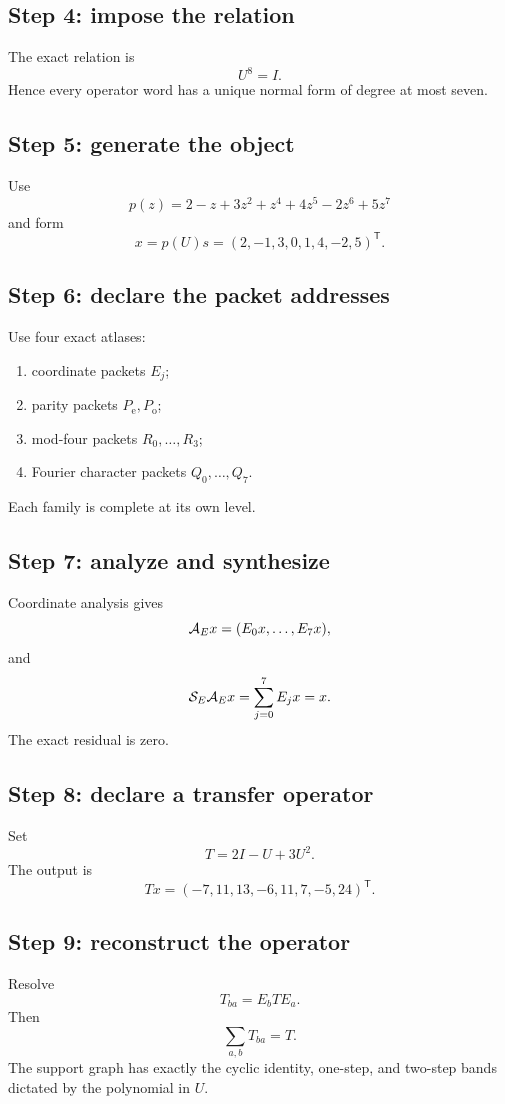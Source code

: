 \subsection{Step 4: impose the relation}
The exact relation is
\[
U^8=I.
\]
Hence every operator word has a unique normal form of degree at most seven.

\subsection{Step 5: generate the object}
Use
\[
p(z)=2-z+3z^2+z^4+4z^5-2z^6+5z^7
\]
and form
\[
x=p(U)s=(2,-1,3,0,1,4,-2,5)^{\mathsf T}.
\]

\subsection{Step 6: declare the packet addresses}
Use four exact atlases:
\begin{enumerate}[label=(\alph*),leftmargin=2em]
\item coordinate packets $E_j$;
\item parity packets $P_{\mathrm e},P_{\mathrm o}$;
\item mod-four packets $R_0,\ldots,R_3$;
\item Fourier character packets $Q_0,\ldots,Q_7$.
\end{enumerate}
Each family is complete at its own level.

\subsection{Step 7: analyze and synthesize}
Coordinate analysis gives
\[
\mathcal A_E x=(E_0x,\ldots,E_7x),
\]
and
\[
\mathcal S_E\mathcal A_E x
=
\sum_{j=0}^7E_jx=x.
\]
The exact residual is zero.

\subsection{Step 8: declare a transfer operator}
Set
\[
T=2I-U+3U^2.
\]
The output is
\[
Tx=(-7,11,13,-6,11,7,-5,24)^{\mathsf T}.
\]

\subsection{Step 9: reconstruct the operator}
Resolve
\[
T_{ba}=E_bTE_a.
\]
Then
\[
\sum_{a,b}T_{ba}=T.
\]
The support graph has exactly the cyclic identity, one-step, and two-step bands dictated by the polynomial in $U$.

